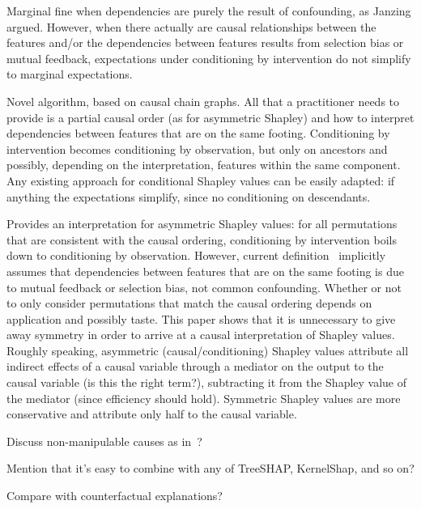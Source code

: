\documentclass{article}
\newcommand{\comment}[1]{{\color{red} #1}}
\begin{document}
Marginal fine when dependencies are purely the result of confounding, as Janzing argued. However, when there actually are causal relationships between the features and/or the dependencies between features results from selection bias or mutual feedback, expectations under conditioning by intervention do not simplify to marginal expectations.

Novel algorithm, based on causal chain graphs. All that a practitioner needs to provide is a partial causal order (as for asymmetric Shapley) and how to interpret dependencies between features that are on the same footing. Conditioning by intervention becomes conditioning by observation, but only on ancestors and possibly, depending on the interpretation, features within the same component. Any existing approach for conditional Shapley values can be easily adapted: if anything the expectations simplify, since no conditioning on descendants.

Provides an interpretation for asymmetric Shapley values: for all permutations that are consistent with the causal ordering, conditioning by intervention boils down to conditioning by observation. However, current definition~\cite{frye2019asymmetric} implicitly assumes that dependencies between features that are on the same footing is due to mutual feedback or selection bias, not common confounding. Whether or not to only consider permutations that match the causal ordering depends on application and possibly taste. This paper shows that it is unnecessary to give away symmetry in order to arrive at a causal interpretation of Shapley values. Roughly speaking, asymmetric (causal/conditioning) Shapley values attribute all indirect effects of a causal variable through a mediator on the output to the causal variable \comment{(is this the right term?)}, subtracting it from the Shapley value of the mediator (since efficiency should hold). Symmetric Shapley values are more conservative and attribute only half to the causal variable.

\comment{Discuss non-manipulable causes as in~\cite{pearl2018obesity}?}
	
\comment{Mention that it's easy to combine with any of TreeSHAP, KernelShap, and so on?}

\comment{Compare with counterfactual explanations?}

%
\end{document}
